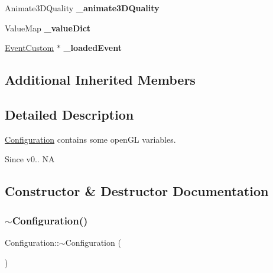 \begin{DoxyCompactItemize}
\item 
\mbox{\label{classConfiguration_aaee938b87601b09699d3ee9b617bf213}} 
Animate3\+D\+Quality {\bfseries \+\_\+animate3\+D\+Quality}
\item 
\mbox{\label{classConfiguration_a1e4a25f0a879afc5db7a5ea6ce89181d}} 
Value\+Map {\bfseries \+\_\+value\+Dict}
\item 
\mbox{\label{classConfiguration_a2b44f7602763cbac853d815a81736d34}} 
\hyperlink{classEventCustom}{Event\+Custom} $\ast$ {\bfseries \+\_\+loaded\+Event}
\end{DoxyCompactItemize}
\subsection*{Additional Inherited Members}


\subsection{Detailed Description}
\hyperlink{classConfiguration}{Configuration} contains some open\+GL variables. 

\begin{DoxySince}{Since}
v0..  NA 
\end{DoxySince}


\subsection{Constructor \& Destructor Documentation}
\mbox{\label{classConfiguration_a0dd0fa189e239f4c9a036303f641441e}} 
\subsubsection{\texorpdfstring{$\sim$\+Configuration()}{~Configuration()}\hspace{0.1cm}{\footnotesize\ttfamily [1/2]}}
{\footnotesize\ttfamily Configuration\+::$\sim$\+Configuration (\begin{DoxyParamCaption}{ }\end{DoxyParamCaption})\hspace{0.3cm}{\ttfamily [virtual]}}

